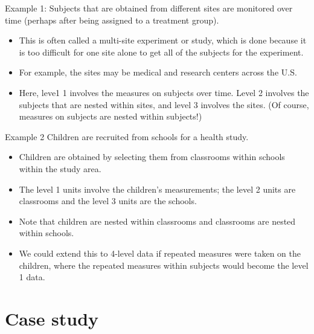 \documentclass[
  9pt,
  ignorenonframetext,
]{beamer}
\begin{document}
\begin{frame}{}
\protect\hypertarget{section-4}{}
\begin{block}{Example 1: Subjects that are obtained from different sites
are monitored over time (perhaps after being assigned to a treatment
group).}
\protect\hypertarget{example-1-subjects-that-are-obtained-from-different-sites-are-monitored-over-time-perhaps-after-being-assigned-to-a-treatment-group.}{}
\begin{itemize}
\item
  This is often called a multi-site experiment or study, which is done
  because it is too difficult for one site alone to get all of the
  subjects for the experiment.
\item
  For example, the sites may be medical and research centers across the
  U.S.
\item
  Here, leve1 1 involves the measures on subjects over time. Level 2
  involves the subjects that are nested within sites, and level 3
  involves the sites. (Of course, measures on subjects are nested within
  subjects!)
\end{itemize}
\end{block}

\begin{block}{Example 2 Children are recruited from schools for a health
study.}
\protect\hypertarget{example-2-children-are-recruited-from-schools-for-a-health-study.}{}
\begin{itemize}
\item
  Children are obtained by selecting them from classrooms within schools
  within the study area.
\item
  The level 1 units involve the children's measurements; the level 2
  units are classrooms and the level 3 units are the schools.
\item
  Note that children are nested within classrooms and classrooms are
  nested within schools.
\item
  We could extend this to 4-level data if repeated measures were taken
  on the children, where the repeated measures within subjects would
  become the level 1 data.
\end{itemize}
\end{block}
\end{frame}

\hypertarget{case-study}{%
\section{Case study}\label{case-study}}
\end{document}
